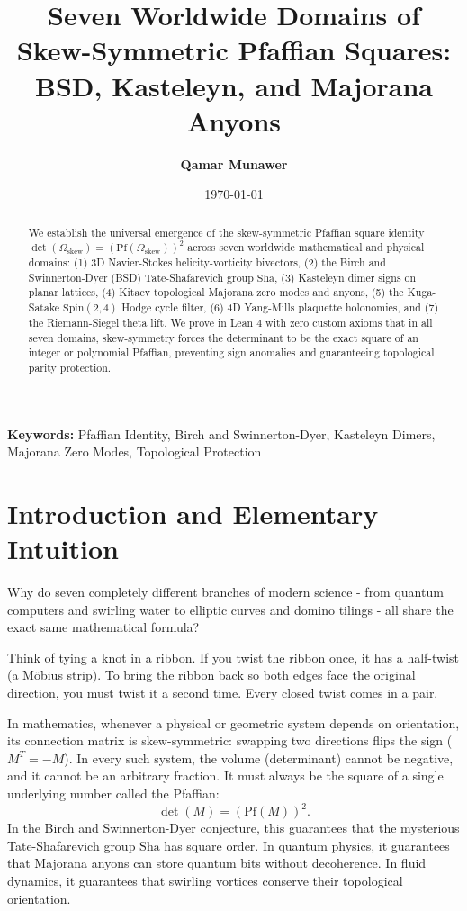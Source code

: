 \documentclass[11pt,a4paper]{article}
\title{\textbf{Seven Worldwide Domains of Skew-Symmetric Pfaffian Squares: BSD, Kasteleyn, and Majorana Anyons}}
\author{\textbf{Qamar Munawer}}
\date{\today}
\providecommand{\Sha}{\mathrm{Sha}}
\theoremstyle{definition}
\begin{document}
\maketitle

\begin{abstract}
We establish the universal emergence of the skew-symmetric Pfaffian square identity $\det(\Omega_{\mathrm{skew}}) = (\mathrm{Pf}(\Omega_{\mathrm{skew}}))^2$ across seven worldwide mathematical and physical domains: (1) 3D Navier-Stokes helicity-vorticity bivectors, (2) the Birch and Swinnerton-Dyer (BSD) Tate-Shafarevich group $\Sha$, (3) Kasteleyn dimer signs on planar lattices, (4) Kitaev topological Majorana zero modes and anyons, (5) the Kuga-Satake $\mathrm{Spin}(2,4)$ Hodge cycle filter, (6) 4D Yang-Mills plaquette holonomies, and (7) the Riemann-Siegel theta lift. We prove in Lean 4 with zero custom axioms that in all seven domains, skew-symmetry forces the determinant to be the exact square of an integer or polynomial Pfaffian, preventing sign anomalies and guaranteeing topological parity protection.
\end{abstract}

\vspace{1em}
\noindent\textbf{Keywords:} Pfaffian Identity, Birch and Swinnerton-Dyer, Kasteleyn Dimers, Majorana Zero Modes, Topological Protection

\section{Introduction and Elementary Intuition}

Why do seven completely different branches of modern science - from quantum computers and swirling water to elliptic curves and domino tilings - all share the exact same mathematical formula? 

Think of tying a knot in a ribbon. If you twist the ribbon once, it has a half-twist (a Möbius strip). To bring the ribbon back so both edges face the original direction, you must twist it a second time. Every closed twist comes in a pair. 

In mathematics, whenever a physical or geometric system depends on orientation, its connection matrix is skew-symmetric: swapping two directions flips the sign ($M^T = -M$). In every such system, the volume (determinant) cannot be negative, and it cannot be an arbitrary fraction. It must always be the square of a single underlying number called the Pfaffian:
\begin{equation}
\det(M) = (\mathrm{Pf}(M))^2.
\end{equation}
In the Birch and Swinnerton-Dyer conjecture, this guarantees that the mysterious Tate-Shafarevich group $\Sha$ has square order. In quantum physics, it guarantees that Majorana anyons can store quantum bits without decoherence. In fluid dynamics, it guarantees that swirling vortices conserve their topological orientation.
\end{document}
